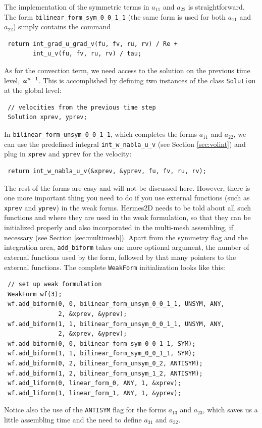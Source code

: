 The implementation of the symmetric terms in $a_{11}$ and $a_{22}$ is straightforward. The form
\verb"bilinear_form_sym_0_0_1_1" (the same form is used for both $a_{11}$ and $a_{22}$)
simply contains the command
\begin{lstlisting}
 return int_grad_u_grad_v(fu, fv, ru, rv) / Re +
        int_u_v(fu, fv, ru, rv) / tau;
\end{lstlisting}
As for the convection term, we need access to the solution on the previous time level, $\mbox{\boldmath $u$}^{n-1}$.
This is accomplished by defining two instances of the class {\tt Solution} at the global level:
\begin{lstlisting}
 // velocities from the previous time step
 Solution xprev, yprev;
\end{lstlisting}
In \verb"bilinear_form_unsym_0_0_1_1", which completes the forms $a_{11}$ and $a_{22}$, we can use
the predefined integral \verb"int_w_nabla_u_v" (see Section \ref{sec:volint})
and plug in {\tt xprev} and {\tt yprev} for the velocity:
\begin{lstlisting}
 return int_w_nabla_u_v(&xprev, &yprev, fu, fv, ru, rv);
\end{lstlisting}
The rest of the forms are easy and will not be discussed here. However, there is one more important
thing you need to do if you use external functions (such as {\tt xprev} and {\tt yprev}) in the
weak forms. Hermes2D needs to be told about all such functions and where they are used in the weak
formulation, so that they can be initialized properly and also incorporated in the multi-mesh assembling,
if necessary (see Section \ref{sec:multimesh}). Apart from the symmetry flag and the integration area,
{\tt add\_biform} takes one more optional argument, the number of external functions used by the form,
followed by that many pointers to the external functions. The complete {\tt WeakForm} initialization
looks like this:
\begin{lstlisting}
 // set up weak formulation
 WeakForm wf(3);
 wf.add_biform(0, 0, bilinear_form_unsym_0_0_1_1, UNSYM, ANY,
               2, &xprev, &yprev);
 wf.add_biform(1, 1, bilinear_form_unsym_0_0_1_1, UNSYM, ANY,
               2, &xprev, &yprev);
 wf.add_biform(0, 0, bilinear_form_sym_0_0_1_1, SYM);
 wf.add_biform(1, 1, bilinear_form_sym_0_0_1_1, SYM);
 wf.add_biform(0, 2, bilinear_form_unsym_0_2, ANTISYM);
 wf.add_biform(1, 2, bilinear_form_unsym_1_2, ANTISYM);
 wf.add_liform(0, linear_form_0, ANY, 1, &xprev);
 wf.add_liform(1, linear_form_1, ANY, 1, &yprev);
\end{lstlisting}
Notice also the use of the {\tt ANTISYM} flag for the forms $a_{13}$ and $a_{23}$, which
saves us a little assembling time and the need to define $a_{31}$ and $a_{32}$. 

